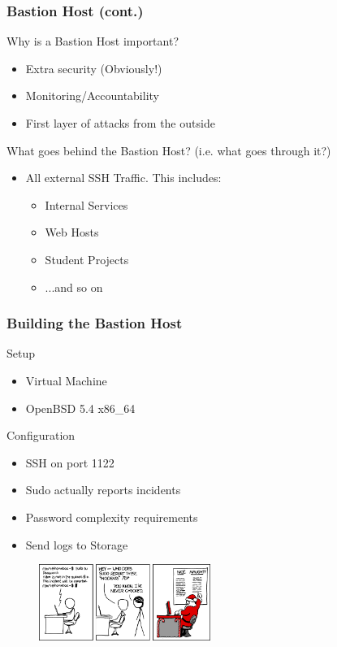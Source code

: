 \documentclass{beamer}
\begin{document}
\begin{frame}
  \frametitle{Bastion Host (cont.)}
Why is a Bastion Host important?
  \begin{itemize}
	\item Extra security (Obviously!)
    \item Monitoring/Accountability
    \item First layer of attacks from the outside 
  \end{itemize}
What goes behind the Bastion Host? (i.e. what goes through it?)
  \begin{itemize}
    \item All external SSH Traffic. This includes:
    \begin{itemize}
      \item Internal Services
      \item Web Hosts
      \item Student Projects
      \item ...and so on
    \end{itemize} 
  \end{itemize}
\end{frame}

\begin{frame}
  \frametitle{Building the Bastion Host}
\begin{multicols}{2}
Setup
  \begin{itemize}
    \item Virtual Machine
    \item OpenBSD 5.4 x86\_64
  \end{itemize}
Configuration  \begin{itemize}
    \item SSH on port 1122
    \item Sudo actually reports incidents
    \item Password complexity requirements
    \item Send logs to Storage
  \end{itemize}
\columnbreak
\begin{figure}[t]
\includegraphics[width=2.2in]{diagrams/sudo.png}
\end{figure}
\end{multicols}
\end{frame}
\end{document}
